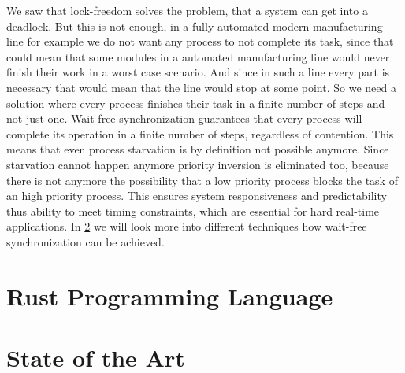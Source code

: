 We saw that lock-freedom solves the problem, that a system can get into a deadlock. But this is not enough, in a fully automated modern manufacturing line for example we do not want any process to not complete its task, since that could mean that some modules in a automated manufacturing line would never finish their work in a worst case scenario. And since in such a line every part is necessary that would mean that the line would stop at some point. So we need a solution where every process finishes their task in a finite number of steps and not just one. Wait-free synchronization guarantees that every process will complete its operation in a finite number of steps, regardless of contention. This means that even process starvation is by definition not possible anymore. Since starvation cannot happen anymore priority inversion is eliminated too, because there is not anymore the possibility that a low priority process blocks the task of an high priority process. This ensures system responsiveness and predictability thus ability to meet timing constraints, which are essential for hard real-time applications. In \cref{sec:state-of-the-art} we will look more into different techniques how wait-free synchronization can be achieved.

\section{Rust Programming Language}\label{sec:rust}

\section{State of the Art}\label{sec:state-of-the-art}